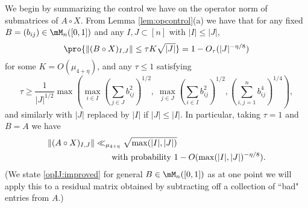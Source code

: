 \documentclass[aop,preprint]{imsart}
\theoremstyle{plain}
\theoremstyle{definition}
\theoremstyle{remark}
\numberwithin{equation}{section}
\numberwithin{theorem}{section}
\begin{document}
We begin by summarizing the control we have on the operator norm of submatrices of $A\circ X$.
%
From Lemma \ref{lem:opcontrol}(a) we have that for any fixed $B=(b_{ij})\in \mM_n([0,1])$ and any $I,J\subset[n]$ with $|I|\le |J|$,
\begin{equation}	\label{opIJ:improved}
\pro{ \|(B\circ X)_{I,J}\| \le \tau K \sqrt{|J|}} = 1-O_\tau(|J|^{-\eta/8})
\end{equation}
for some $K=O(\mu_{4+\eta})$, and any $\tau\le 1$ satisfying 
\begin{equation}
\tau \ge \frac1{|J|^{1/2}}\max\left( \max_{i \in I}\left( \sum_{j\in J} b_{ij}^2\right)^{1/2}, \;\max_{j\in J}\left( \sum_{i\in I} b_{ij}^2 \right)^{1/2}, \left( \sum_{i,j=1}^n b_{ij}^4\right)^{1/4} \right),
\end{equation}
and similarly with $|J|$ replaced by $|I|$ if $|J|\le |I|$.
%
In particular, taking $\tau=1$ and $B=A$ we have
\begin{align}
\|(A\circ X)_{I,J}\| &\ll_{\mu_{4+\eta}} \sqrt{\max(|I|,|J|)}	\notag \\
&\qquad \text{with probability } 1-O(\max(|I|,|J|)^{-\eta/8}).	\label{opIJ}
\end{align}
(We state \eqref{opIJ:improved} for general $B\in \mM_n([0,1])$ as at one point we will apply this to a residual matrix obtained by subtracting off a collection of ``bad" entries from $A$.)
\end{document}
